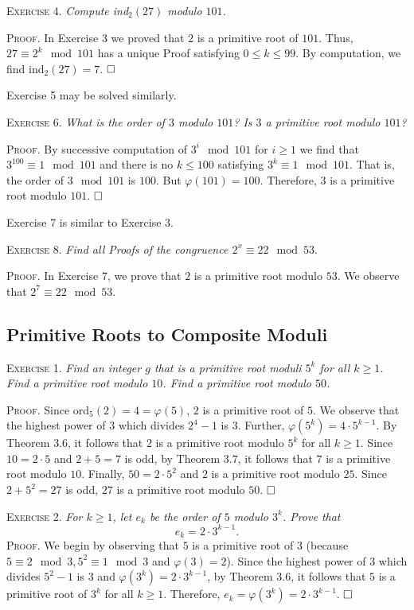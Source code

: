 \documentclass[11pt, leqno]{article}
\newcommand{\done}{\ensuremath{\hfill\square}}
\begin{document}
\textsc{Exercise 4}. \emph{Compute \emph{ind}$_2(27)$ modulo $101$.}

\textsc{Proof}. In Exercise 3 we proved that $2$ is a primitive root of $101$. Thus, $27 \equiv 2^k \mod 101$ has a unique Proof satisfying $0\leq k \leq 99$. By computation, we find ind$_2(27) = 7$. \done

Exercise 5 may be solved similarly.

\textsc{Exercise 6}. \emph{What is the order of $3$ modulo $101$? Is $3$ a primitive root modulo $101$?}

\textsc{Proof}. By successive computation of $3^i \mod 101$ for $i\geq 1$ we find that $3^{100}\equiv 1 \mod 101$ and there is no $k\leq 100$ satisfying $3^k \equiv 1 \mod 101$. That is, the order of $3 \mod 101$ is $100$. But $\varphi(101) = 100$. Therefore, $3$ is a primitive root modulo $101$. \done

Exercise 7 is similar to Exercise 3.

\textsc{Exercise 8}. \emph{Find all Proofs of the congruence $2^x \equiv 22 \mod 53$}.

\textsc{Proof}. In Exercise 7, we prove that $2$ is a primitive root modulo $53$. We observe that $2^7 \equiv 22 \mod 53$. 

\subsection{Primitive Roots to Composite Moduli}

\textsc{Exercise 1}. \emph{Find an integer $g$ that is a primitive root moduli $5^k$ for all $k \geq 1$. Find a primitive root modulo $10$. Find a primitive root modulo $50$.}

\textsc{Proof}. Since ord$_5(2) = 4 = \varphi(5)$, $2$ is a primitive root of $5$. We observe that the highest power of $3$ which divides $2^4-1$ is $3$. Further, $\varphi(5^k) = 4\cdot 5^{k-1}$. By Theorem $3.6$, it follows that $2$ is a primitive root modulo $5^k$ for all $k\geq 1$. Since $10 = 2\cdot 5$ and $2+5 = 7 $ is odd, by Theorem $3.7$, it follows that $7$ is a primitive root modulo $10$. Finally, $50 = 2 \cdot 5^2$ and $2$ is a primitive root modulo $25$. Since $2+5^2 = 27$ is odd, $27$ is a primitive root modulo $50$. \done

\textsc{Exercise 2}. \emph{For $k \geq 1$, let $e_k$ be the order of $5$ modulo $3^k$. Prove that 
\begin{displaymath}
e_k = 2\cdot 3^{k-1}.
\end{displaymath}}\textsc{Proof}. We begin by observing that $5$ is a primitive root of $3$ (because $5 \equiv 2 \mod 3, 5^2 \equiv 1 \mod 3$ and $\varphi(3) = 2$). Since the highest power of $3$ which divides $5^2-1$ is $3$ and $\varphi(3^k) = 2\cdot 3^{k-1}$, by Theorem $3.6$, it follows that $5$ is a primitive root of $3^k$ for all $k\geq 1$. Therefore, $e_k = \varphi(3^k) = 2\cdot 3^{k-1}$. \done
\end{document}
